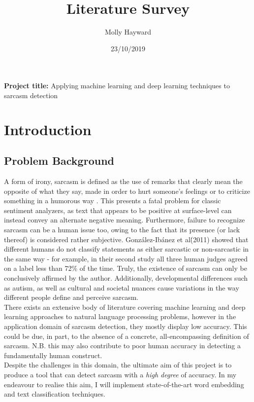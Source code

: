\documentclass[12pt,a4paper]{article}
\title{Literature Survey}
\author{Molly Hayward}
\date{23/10/2019}
\begin{document}
\maketitle
\begin{center}
	\textbf{Project title:} Applying machine learning and deep learning techniques to sarcasm detection
\end{center}


\section{Introduction}
\subsection{Problem Background}
\noindent A form of irony, sarcasm is defined as the use of remarks that clearly mean the opposite of what they say, made in order to hurt someone's feelings or to criticize something in a humorous way \cite{cambridge2019}. This presents a fatal problem for classic sentiment analyzers, as text that appears to be positive at surface-level can instead convey an alternate negative meaning. Furthermore, failure to recognize sarcasm can be a human issue too, owing to the fact that its presence (or lack thereof) is considered rather subjective. Gonz{\'a}lez-Ib{\'a}nez et al\. (2011) \cite{gonzalez2011identifying} showed that different humans do not classify statements as either sarcastic or non-sarcastic in the same way - for example, in their second study all three human judges agreed on a label less than 72\% of the time. Truly, the existence of sarcasm can only be conclusively affirmed by the author. Additionally, developmental differences such as autism, as well as cultural and societal nuances cause variations in the way different people define and perceive sarcasm. \\

\noindent There exists an extensive body of literature covering machine learning and deep learning approaches to natural language processing problems, however in the application domain of sarcasm detection, they mostly display low accuracy. This could be due, in part, to the absence of a concrete, all-encompassing definition of sarcasm. N.B. this may also contribute to poor human accuracy in detecting a fundamentally human construct. \\

\noindent Despite the challenges in this domain, the ultimate aim of this project is to produce a tool that can detect sarcasm with a \textit{high degree} of accuracy. In my endeavour to realise this aim, I will implement state-of-the-art word embedding and text classification techniques.
\end{document}
